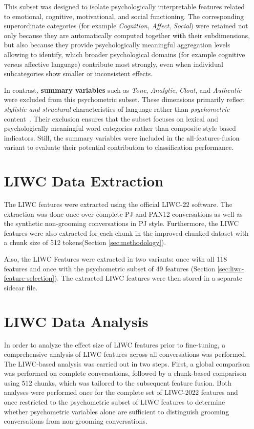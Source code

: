 This subset was designed to isolate psychologically interpretable features related to emotional, cognitive, motivational, and social functioning. 
The corresponding superordinate categories (for example \textit{Cognition}, \textit{Affect}, \textit{Social}) were retained not only because they are automatically computed together with their subdimensions, but also because they provide psychologically meaningful aggregation levels allowing to identify, which broader psychological domains (for example cognitive versus affective language) contribute most strongly, even when individual subcategories show smaller or inconsistent effects. 

In contrast, \textbf{summary variables} such as \textit{Tone}, \textit{Analytic}, \textit{Clout}, and \textit{Authentic} were excluded from this psychometric subset. These dimensions primarily reflect \textit{stylistic and structural} characteristics of language rather than \textit{psychometric} content~\cite{pennebaker2022liwc,tausczik2010psychological}. 
Their exclusion ensures that the subset focuses on lexical and psychologically meaningful word categories rather than composite style based indicators. Still, the summary variables were included in the all-features-fusion variant to evaluate their potential contribution to classification performance.


\section{LIWC Data Extraction}

The LIWC features were extracted using the official LIWC-22 software. The extraction was done once over complete PJ and PAN12 conversations as well as the synthetic non-grooming conversations in PJ style. Furthermore, the LIWC features were also extracted for each chunk in the improved chunked dataset with a chunk size of 512 tokens(Section \ref{sec:methodology}).

Also, the LIWC Features were extracted in two variants: once with all 118 features and once with the psychometric subset of 49 features (Section \ref{sec:liwc-feature-selection}). The extracted LIWC features were then stored in a separate sidecar file.

\section{LIWC Data Analysis}

In order to analyze the effect size of LIWC features prior to fine-tuning, a comprehensive analysis of LIWC features across all conversations was performed.
The LIWC-based analysis was carried out in two steps. First, a global comparison was performed on complete conversations, followed by a chunk-based comparison using 512 chunks, which was tailored to the subsequent feature fusion. Both analyses were performed once for the complete set of LIWC-2022 features and once restricted to the psychometric subset of LIWC features to determine whether psychometric variables alone are sufficient to distinguish grooming conversations from non-grooming conversations.

